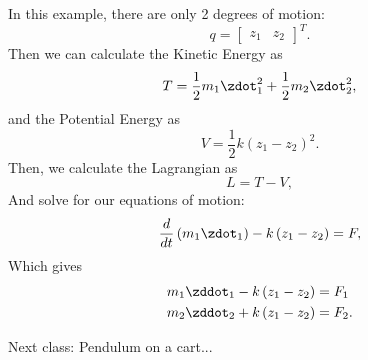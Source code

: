 \documentclass[10pt]{article}
\begin{document}
In this example, there are only 2 degrees of motion:
\begin{equation}
  q =
  \begin{bmatrix}
    z_1 & z_2
  \end{bmatrix}^T.
\end{equation}
Then we can calculate the Kinetic Energy as
\begin{equation}
  T = \frac1 2 m_1\zdot^2_1 + \frac{1}{2}m_2 \zdot^2_2,
\end{equation}
and the Potential Energy as 
\begin{equation}
  V = \frac{1}{2}k\left(z_1 - z_2\right)^2.
\end{equation}
Then, we calculate the Lagrangian as
\begin{equation}
  L = T - V,
\end{equation}
And solve for our equations of motion:
\begin{equation}
  \frac{d}{dt}\left(m_1 \zdot_1\right) - k\left(z_1 - z_2\right) = F,
\end{equation}
Which gives
\begin{equation}
  \begin{split}
    m_1\zddot_1 -k\left(z_1 - z_2\right) &= F_1\\
    m_2\zddot_2 + k\left(z_1 - z_2\right) &= F_2.
  \end{split}
\end{equation}

Next class: Pendulum on a cart...
\end{document}
